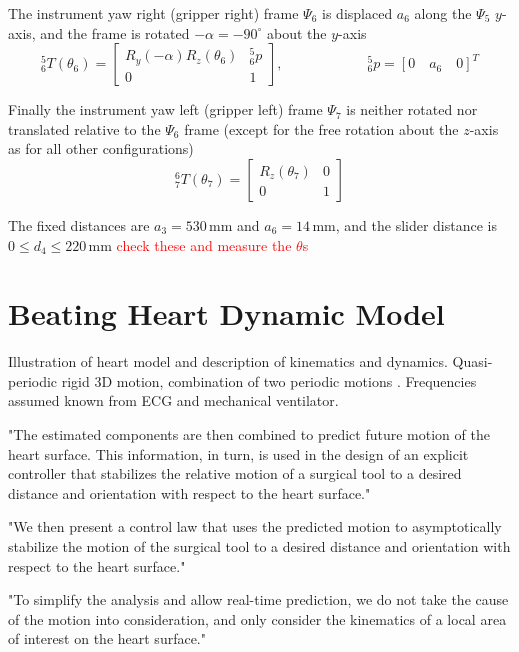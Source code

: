 The instrument yaw right (gripper right) frame $\Psi_6$ is displaced $a_6$ along the $\Psi_5$ $y$-axis, and the frame is rotated $-\alpha=-90^\circ$ about the $y$-axis
\begin{equation}
^5_6 T(\theta_6) = 
\begin{bmatrix}
R_y(-\alpha)R_z(\theta_6) & ^5_6p\\
0 & 1
\end{bmatrix}, 
\qquad\qquad\qquad
^5_6p = [0 \quad a_6 \quad 0]^T
\end{equation}

Finally the instrument yaw left (gripper left) frame $\Psi_7$ is neither rotated nor translated relative to the $\Psi_6$ frame (except for the free rotation about the $z$-axis as for all other configurations)
\begin{equation}
^6_7 T(\theta_7) = 
\begin{bmatrix}
R_z(\theta_7) & 0\\
0 & 1
\end{bmatrix}
\end{equation}

The fixed distances are $a_3=530$\,mm and $a_6=14$\,mm, and the slider distance is $0\leq d_4 \leq 220$\,mm \textcolor{red}{check these and measure the $\theta$s} 


\section{Beating Heart Dynamic Model}
Illustration of heart model and description of kinematics and dynamics.
Quasi-periodic rigid 3D motion, combination of two periodic motions \cite{bib:heart_berkeley}. Frequencies assumed known from ECG and mechanical ventilator.

"The estimated components are then combined to predict future motion of the heart surface. This information, in turn, is used in the design of an explicit controller that stabilizes the relative motion of a surgical tool to a desired distance and orientation with respect to the heart surface."

"We then present a control law that uses the predicted motion to asymptotically stabilize the motion of the surgical tool to a desired distance and orientation with respect to the heart surface."

"To simplify the analysis and allow real-time prediction, we do not take the cause of the motion into consideration, and only consider the kinematics of a local area of interest on the heart surface."


